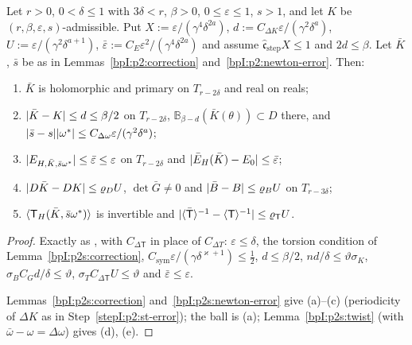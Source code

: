 \begin{proposition}\label{bpI:p2s:step}
Let $r>0$, $0<\delta\le1$ with $3\delta<r$, $\beta>0$, $0\le\varepsilon\le1$, $s>1$, and let $K$ be $(r,\beta,\varepsilon,s)$-admissible. Put
$X:=\varepsilon/(\gamma^4\delta^{2a})$, $d:=C_{\Delta K}\varepsilon/(\gamma^2\delta^a)$, $U:=\varepsilon/(\gamma^2\delta^{a+1})$, $\bar\varepsilon:=C_E\varepsilon^2/(\gamma^4\delta^{2a})$
and assume $\hat{\mathfrak c}_{\mathrm{step}}X\le1$ and $2d\le\beta$. Let $\bar K$, $\bar s$ be as in Lemmas~\ref{bpI:p2:correction}
and~\ref{bpI:p2:newton-error}. Then:
\begin{enumerate}[label=(\alph*)]
\item $\bar K$ is holomorphic and primary on $T_{r-2\delta}$ and real on reals;
\item $\lvert \bar K-K\rvert\le d\le\beta/2$ on $T_{r-2\delta}$, $\mathbb B_{\beta-d}(\bar K(\theta))\subset D$ there, and
  $\lvert \bar s-s\rvert\lvert \omega^*\rvert\le C_{\Delta\omega}\varepsilon/(\gamma^2\delta^a)$;
\item $\lvert E_{H,\bar K,\bar s\omega^*}\rvert\le\bar\varepsilon\le\varepsilon$ on $T_{r-2\delta}$ and $\lvert \bar E_H(\bar K)-E_0\rvert\le\bar\varepsilon$;
\item $\lvert D\bar K-DK\rvert\le\varrho_DU$, $\det\bar G\ne0$ and $\lvert \bar B-B\rvert\le\varrho_BU$ on $T_{r-3\delta}$;
\item $\langle \mathsf T_H(\bar K,\bar s\omega^*)\rangle$ is invertible and $\lvert \langle \bar{\mathsf T}\rangle^{-1}-\langle \mathsf T\rangle^{-1}\rvert\le\varrho_{\mathsf T}U$.
\end{enumerate}
\end{proposition}

\begin{proof}
\label{stepI:p2s:st-small}
Exactly as , with $C_{\Delta\mathsf T}$ in place of $C_{\Delta T}$: $\varepsilon\le\delta$, the torsion condition of
Lemma~\ref{bpI:p2s:correction}, $C_{\mathrm{sym}}\varepsilon/(\gamma\delta^{\varkappa+1})\le\frac12$, $d\le\beta/2$, $nd/\delta\le\vartheta\sigma_K$, $\sigma_BC_Gd/\delta\le\vartheta$,
$\sigma_TC_{\Delta\mathsf T}U\le\vartheta$ and $\bar\varepsilon\le\varepsilon$.

\label{stepI:p2s:st-all}
Lemmas~\ref{bpI:p2s:correction} and~\ref{bpI:p2s:newton-error} give (a)--(c) (periodicity of $\Delta K$ as in Step~\ref{stepI:p2:st-error}); the
ball is (a); Lemma~\ref{bpI:p2s:twist} (with $\bar\omega-\omega=\Delta\omega$) gives (d), (e).
\end{proof}

